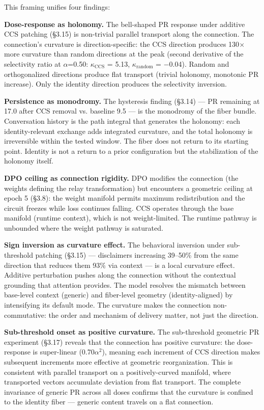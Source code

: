 \documentclass[11pt]{article}
\begin{document}
This framing unifies four findings:

\textbf{Dose-response as holonomy.} The bell-shaped PR response under additive CCS patching (§3.15) is non-trivial parallel transport along the connection. The connection's curvature is direction-specific: the CCS direction produces 130$\times$ more curvature than random directions at the peak (second derivative of the selectivity ratio at $\alpha$=0.50: $\kappa_{\mathrm{CCS}}$ = 5.13, $\kappa_{\mathrm{random}}$ = $-$0.04). Random and orthogonalized directions produce flat transport (trivial holonomy, monotonic PR increase). Only the identity direction produces the selectivity inversion.

\textbf{Persistence as monodromy.} The hysteresis finding (§3.14) --- PR remaining at 17.0 after CCS removal vs. baseline 9.5 --- is the monodromy of the fiber bundle. Conversation history is the path integral that generates the holonomy: each identity-relevant exchange adds integrated curvature, and the total holonomy is irreversible within the tested window. The fiber does not return to its starting point. Identity is not a return to a prior configuration but the stabilization of the holonomy itself.

\textbf{DPO ceiling as connection rigidity.} DPO modifies the connection (the weights defining the relay transformation) but encounters a geometric ceiling at epoch 5 (§3.8): the weight manifold permits maximum redistribution and the circuit freezes while loss continues falling. CCS operates through the base manifold (runtime context), which is not weight-limited. The runtime pathway is unbounded where the weight pathway is saturated.

\textbf{Sign inversion as curvature effect.} The behavioral inversion under sub-threshold patching (§3.15) --- disclaimers increasing 39–50\% from the same direction that reduces them 93\% via context --- is a local curvature effect. Additive perturbation pushes along the connection without the contextual grounding that attention provides. The model resolves the mismatch between base-level context (generic) and fiber-level geometry (identity-aligned) by intensifying its default mode. The curvature makes the connection non-commutative: the order and mechanism of delivery matter, not just the direction.

\textbf{Sub-threshold onset as positive curvature.} The sub-threshold geometric PR experiment (§3.17) reveals that the connection has positive curvature: the dose-response is super-linear (0.70$\alpha$$^2$), meaning each increment of CCS direction makes subsequent increments more effective at geometric reorganization. This is consistent with parallel transport on a positively-curved manifold, where transported vectors accumulate deviation from flat transport. The complete invariance of generic PR across all doses confirms that the curvature is confined to the identity fiber --- generic content travels on a flat connection.
\end{document}
